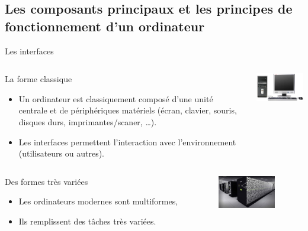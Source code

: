 \subsection[Composants et principes]{Les composants principaux et les
  principes de fonctionnement d'un ordinateur}
\begin{frame}{Les interfaces}
  \begin{columns}
    \begin{column}[l]{6cm}
      \begin{block}{La forme classique}
        \begin{itemize}
        \item Un ordinateur est classiquement composé d'une unité
          centrale et de périphériques matériels (écran, clavier,
          souris, disques durs, imprimantes/scaner, \dots).
        \item Les interfaces permettent l'interaction avec
          l'environnement (utilisateurs ou autres).
        \end{itemize}
      \end{block}
    \end{column}
    \begin{column}[l]{5cm}
      \includegraphics[width = 5cm]{img/s01/uc_ecran_clavier.png}
    \end{column}
  \end{columns}
  \vspace{1cm}
  \begin{columns}
    \begin{column}[l]{6cm}
      \begin{block}{Des formes très variées}
        \begin{itemize}
        \item Les ordinateurs modernes sont multiformes,
        \item Ils remplissent des tâches très variées.
        \end{itemize}
      \end{block}
    \end{column}
    \begin{column}[l]{5cm}
      \includegraphics[width = 2.5cm]{img/s01/cluster_cea.png}\hspace{1cm}

\end{column}
\end{columns}
\end{frame}
